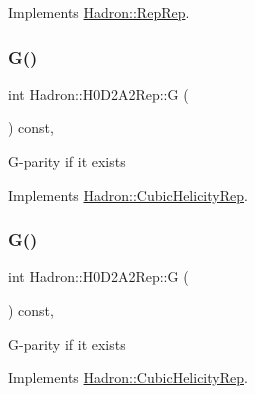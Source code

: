 Implements \mbox{\hyperlink{structHadron_1_1RepRep_a92c8802e5ed7afd7da43ccfd5b7cd92b}{Hadron\+::\+Rep\+Rep}}.

\mbox{\label{structHadron_1_1H0D2A2Rep_acee9edaa8107329ea6d26aa6384ca83f}} 
\subsubsection{\texorpdfstring{G()}{G()}\hspace{0.1cm}{\footnotesize\ttfamily [1/3]}}
{\footnotesize\ttfamily int Hadron\+::\+H0\+D2\+A2\+Rep\+::G (\begin{DoxyParamCaption}{ }\end{DoxyParamCaption}) const\hspace{0.3cm}{\ttfamily [inline]}, {\ttfamily [virtual]}}

G-\/parity if it exists 

Implements \mbox{\hyperlink{structHadron_1_1CubicHelicityRep_a50689f42be1e6170aa8cf6ad0597018b}{Hadron\+::\+Cubic\+Helicity\+Rep}}.

\mbox{\label{structHadron_1_1H0D2A2Rep_acee9edaa8107329ea6d26aa6384ca83f}} 
\subsubsection{\texorpdfstring{G()}{G()}\hspace{0.1cm}{\footnotesize\ttfamily [2/3]}}
{\footnotesize\ttfamily int Hadron\+::\+H0\+D2\+A2\+Rep\+::G (\begin{DoxyParamCaption}{ }\end{DoxyParamCaption}) const\hspace{0.3cm}{\ttfamily [inline]}, {\ttfamily [virtual]}}

G-\/parity if it exists 

Implements \mbox{\hyperlink{structHadron_1_1CubicHelicityRep_a50689f42be1e6170aa8cf6ad0597018b}{Hadron\+::\+Cubic\+Helicity\+Rep}}.

\mbox{\label{structHadron_1_1H0D2A2Rep_acee9edaa8107329ea6d26aa6384ca83f}} 
